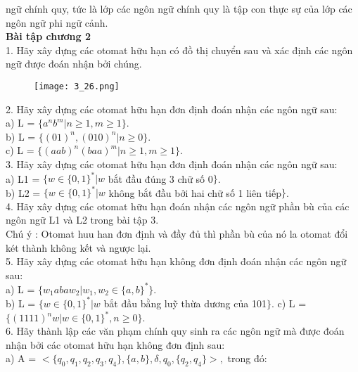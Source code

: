 \begin{flushleft}
ngữ chính quy, tức là lớp các ngôn ngữ chính quy là tập con thực sự của lớp các ngôn ngữ phi
ngữ cảnh.\\
\textbf{Bài tập chương 2}\\
1. Hãy xây dựng các otomat hữu hạn có đồ thị chuyển sau và xác định các ngôn ngữ được
đoán nhận bởi chúng.\\
\begin{figure}[ht]
\texttt{[image: 3\_26.png]}
\end{figure}
2. Hãy xây dựng các otomat hữu hạn đơn định đoán nhận các ngôn ngữ sau:\\
\hspace{10mm} a) L = $\{a^nb^m | n \ge 1, m \ge 1\}.$\\
\hspace{10mm} b) L = $\{(01)^n, (010)^n | n \ge 0\}.$\\
\hspace{10mm} c) L = $\{(aab)^n(baa)^m | n \ge 1, m \ge 1\}.$\\
3. Hãy xây dựng các otomat hữu hạn đơn định đoán nhận các ngôn ngữ sau:\\
\hspace{10mm} a) L1 = $\{w \in \{0, 1\}^* | w$ bắt đầu đúng 3 chữ số 0$\}$.\\
\hspace{10mm} b) L2 = $\{ w \in \{0, 1\}^* | w$ không bắt đầu bởi hai chữ số 1 liên tiếp$\}$.\\
4. Hãy xây dựng các otomat hữu hạn đoán nhận các ngôn ngữ phần bù của các ngôn ngữ L1
và L2 trong bài tập 3.\\
Chú ý : Otomat huu han đơn định và đầy đủ thì phần bù của nó la otomat đổi két thành không
kết và ngược lại.\\
5. Hãy xây dựng các otomat hữu hạn không đơn định đoán nhận các ngôn ngữ sau:\\
\hspace{10mm} a) L = $\{w_1abaw_2 | w_1, w_2 \in \{a, b\}^*\}.$\\
\hspace{10mm} b) L = $\{w \in \{0, 1\}^* | w$ bắt đầu bằng luỹ thừa dương của 101$\}$.
\hspace{10mm} c) L = $\{(1111)^nw | w \in \{0, 1\}^*, n \ge 0\}.$\\
6. Hãy thành lập các văn phạm chính quy sinh ra các ngôn ngữ mà được đoán nhận bởi các
otomat hữu hạn không đơn định sau:\\
\hspace{10mm} a) A = $<\{q_0, q_1, q_2, q_3, q_4\}, \{a, b\}, \delta, q_0, \{q_2, q_4\}>,$ trong đó:\\

\end{flushleft}
